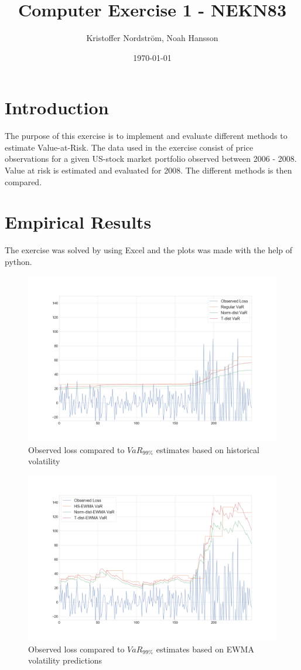 \documentclass[a4paper]{article}
\title{Computer Exercise 1 - NEKN83}
\author{Kristoffer Nordström, Noah Hansson}
\date{\today}
\begin{document}
\maketitle

\section{Introduction}
The purpose of this exercise is to implement and evaluate different methods to estimate Value-at-Risk. The data used in the exercise consist of price observations for a given US-stock market portfolio observed between 2006 - 2008. Value at risk is estimated and evaluated for 2008. The different methods is then compared.

\section{Empirical Results}
The exercise was solved by using Excel and the plots was made with the help of python.

\begin{figure}[h]
    \includegraphics[width=\textwidth]{VaR1.png}
    \caption{Observed loss compared to $VaR_{99\%}$ estimates based on historical volatility}
    \label{var1}
\end{figure}

\begin{figure}[h]
    \includegraphics[width=\textwidth]{VaR2.png}
    \caption{Observed loss compared to $VaR_{99\%}$ estimates based on EWMA volatility predictions}
    \label{var2}
\end{figure}
\end{document}
